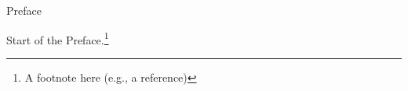 \documentclass[main_brownies.tex]{subfiles}
\begin{document}
\newrefsection %


\checkoddpage
\ifoddpage
\else
	\newpage\thispagestyle{empty}
	\mbox{}
	\newpage
\fi


\chapter*{}


\thispagestyle{frontmattertitle}
\pagestyle{frontmatter} %

\vspace*{5cm} %

\begin{flushright}
\titlestyle\Huge
	Preface
\end{flushright}



Start of the Preface.\footnote{A footnote here (e.g., a reference)}

\Blindtext[7][3]





\end{document}
